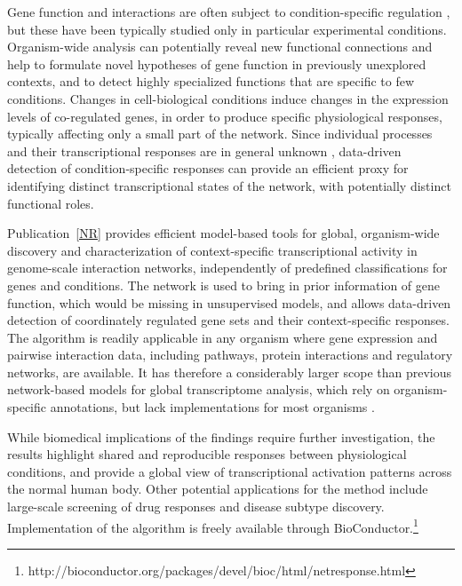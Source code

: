 Gene function and interactions are often subject to condition-specific
regulation \citep{Liang06, Rachlin06}, but these have been typically
studied only in particular experimental conditions. Organism-wide
analysis can potentially reveal new functional connections and help to
formulate novel hypotheses of gene function in previously unexplored
contexts, and to detect highly specialized functions that are specific
to few conditions. Changes in cell-biological conditions induce
changes in the expression levels of co-regulated genes, in order to
produce specific physiological responses, typically affecting only a
small part of the network. Since individual processes and their
transcriptional responses are in general unknown \citep{Lee08c,
  Montaner09}, data-driven detection of condition-specific responses
can provide an efficient proxy for identifying distinct
transcriptional states of the network, with potentially distinct
functional roles.

Publication~\ref{NR} provides efficient model-based tools for global,
organism-wide discovery and characterization of context-specific
transcriptional activity in genome-scale interaction networks,
independently of predefined classifications for genes and
conditions. The network is used to bring in prior information of gene
function, which would be missing in unsupervised models, and allows
data-driven detection of coordinately regulated gene sets and their
context-specific responses. The algorithm is readily applicable in any
organism where gene expression and pairwise interaction data,
including pathways, protein interactions and regulatory networks, are
available. It has therefore a considerably larger scope than previous
network-based models for global transcriptome analysis, which rely on
organism-specific annotations, but lack implementations for most
organisms \citep{Reiss06, Tanay04}.

While biomedical implications of the findings require further
investigation, the results highlight shared and reproducible responses
between physiological conditions, and provide a global view of
transcriptional activation patterns across the normal human
body. Other potential applications for the method include large-scale
screening of drug responses and disease subtype
discovery. Implementation of the algorithm is freely available through
BioConductor.\footnote{http://bioconductor.org/packages/devel/bioc/html/netresponse.html}



